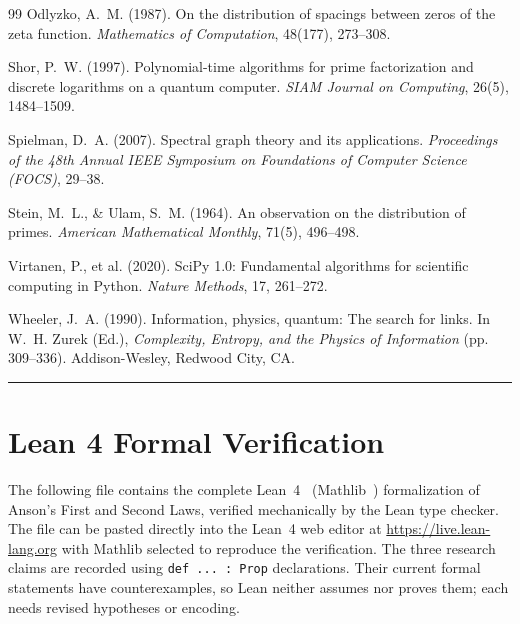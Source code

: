 \documentclass[12pt]{article}
\theoremstyle{lawstyle}
\theoremstyle{conjstyle}
\theoremstyle{predstyle}
\begin{document}
\begin{thebibliography}{99}
Odlyzko, A.~M. (1987).
On the distribution of spacings between zeros of the zeta function.
\textit{Mathematics of Computation}, 48(177), 273--308.

Shor, P.~W. (1997).
Polynomial-time algorithms for prime factorization and discrete logarithms on a quantum computer.
\textit{SIAM Journal on Computing}, 26(5), 1484--1509.

Spielman, D.~A. (2007).
Spectral graph theory and its applications.
\textit{Proceedings of the 48th Annual IEEE Symposium on Foundations of Computer Science (FOCS)}, 29--38.

Stein, M.~L., \& Ulam, S.~M. (1964).
An observation on the distribution of primes.
\textit{American Mathematical Monthly}, 71(5), 496--498.

Virtanen, P., et al. (2020).
SciPy 1.0: Fundamental algorithms for scientific computing in Python.
\textit{Nature Methods}, 17, 261--272.

Wheeler, J.~A. (1990).
Information, physics, quantum: The search for links.
In W.~H. Zurek (Ed.), \textit{Complexity, Entropy, and the Physics of Information} (pp. 309--336). Addison-Wesley, Redwood City, CA.

\end{thebibliography}

\bigskip
\hrule
\bigskip

\appendix
\section{Lean 4 Formal Verification}

The following file contains the complete Lean~4~\cite{lean4} (Mathlib~\cite{mathlib2020}) formalization of
Anson's First and Second Laws, verified mechanically by the Lean type checker.
The file can be pasted directly into the Lean~4 web editor at
\url{https://live.lean-lang.org} with Mathlib selected to reproduce the
verification. The three research claims are recorded using \texttt{def ... : Prop}
declarations. Their current formal statements have counterexamples, so Lean
neither assumes nor proves them; each needs revised hypotheses or encoding.

\bigskip
\end{document}
